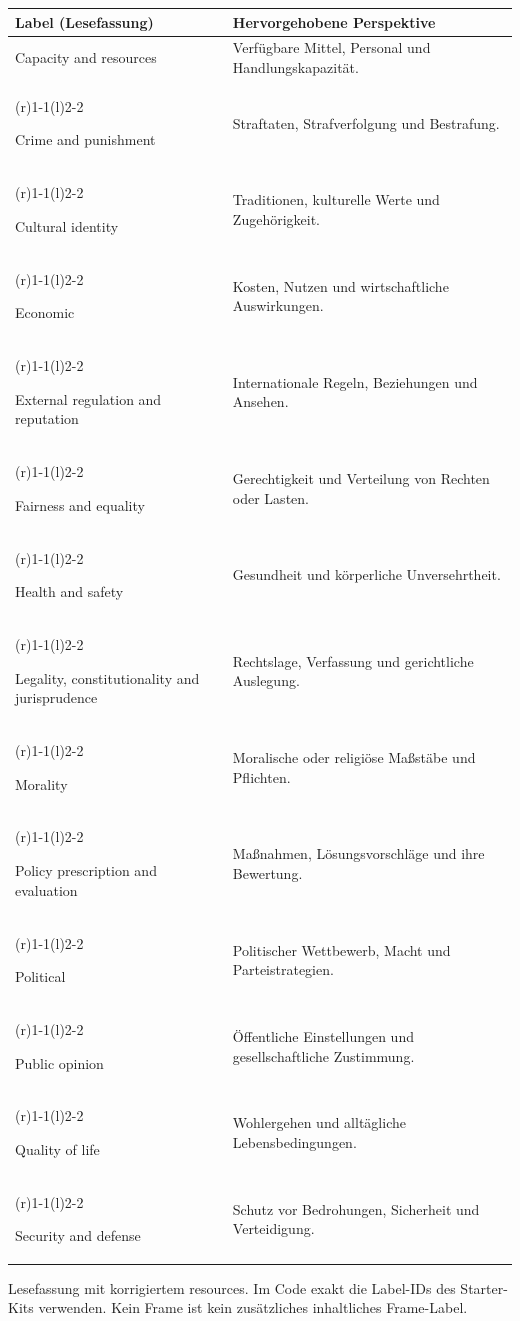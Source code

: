 \documentclass[10pt,a4paper]{article}
\renewcommand{\normalsize}{\fontsize{9.5}{12}\selectfont}
\newcommand{\agendarule}{%
  \arrayrulecolor{black!20}%
  \cmidrule(r){1-1}\cmidrule(l){2-2}%
  \arrayrulecolor{black}%
}
\begin{document}
\small
\begin{tabularx}{\linewidth}{@{}>{\raggedright\arraybackslash}p{6.2cm} >{\raggedright\arraybackslash}X@{}}
\toprule
\textbf{Label (Lesefassung)} & \textbf{Hervorgehobene Perspektive} \\
\midrule
Capacity and resources & Verfügbare Mittel, Personal und Handlungskapazität. \\
\agendarule
Crime and punishment & Straftaten, Strafverfolgung und Bestrafung. \\
\agendarule
Cultural identity & Traditionen, kulturelle Werte und Zugehörigkeit. \\
\agendarule
Economic & Kosten, Nutzen und wirtschaftliche Auswirkungen. \\
\agendarule
External regulation and reputation & Internationale Regeln, Beziehungen und Ansehen. \\
\agendarule
Fairness and equality & Gerechtigkeit und Verteilung von Rechten oder Lasten. \\
\agendarule
Health and safety & Gesundheit und körperliche Unversehrtheit. \\
\agendarule
Legality, constitutionality and jurisprudence & Rechtslage, Verfassung und gerichtliche Auslegung. \\
\agendarule
Morality & Moralische oder religiöse Maßstäbe und Pflichten. \\
\agendarule
Policy prescription and evaluation & Maßnahmen, Lösungsvorschläge und ihre Bewertung. \\
\agendarule
Political & Politischer Wettbewerb, Macht und Parteistrategien. \\
\agendarule
Public opinion & Öffentliche Einstellungen und gesellschaftliche Zustimmung. \\
\agendarule
Quality of life & Wohlergehen und alltägliche Lebensbedingungen. \\
\agendarule
Security and defense & Schutz vor Bedrohungen, Sicherheit und Verteidigung. \\
\bottomrule
\end{tabularx}
\normalsize
{\footnotesize Lesefassung mit korrigiertem \glqq resources\grqq{}. Im Code exakt die Label-IDs
des Starter-Kits verwenden. \glqq Kein Frame\grqq{} ist kein zusätzliches inhaltliches Frame-Label.}
\end{document}
